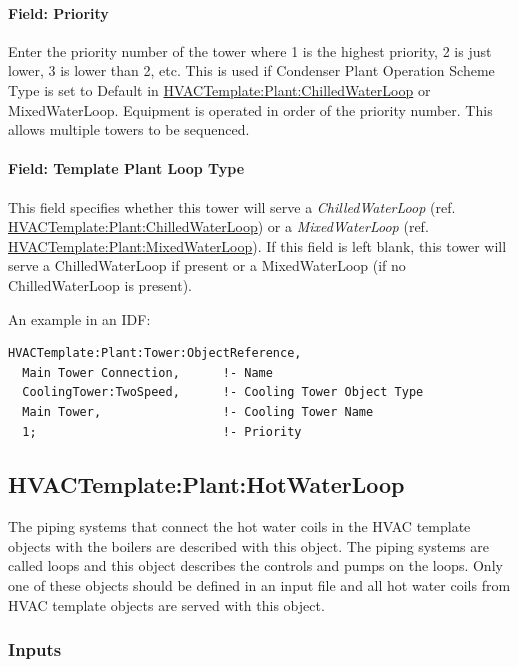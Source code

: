 \paragraph{Field: Priority}\label{field-priority-3}

Enter the priority number of the tower where 1 is the highest priority, 2 is just lower, 3 is lower than 2, etc. This is used if Condenser Plant Operation Scheme Type is set to Default in \hyperref[hvactemplateplantchilledwaterloop]{HVACTemplate:Plant:ChilledWaterLoop} or MixedWaterLoop. Equipment is operated in order of the priority number. This allows multiple towers to be sequenced.

\paragraph{Field: Template Plant Loop Type}\label{field-template-plant-loop-type-1}

This field specifies whether this tower will serve a \emph{ChilledWaterLoop} (ref. \hyperref[hvactemplateplantchilledwaterloop]{HVACTemplate:Plant:ChilledWaterLoop}) or a \emph{MixedWaterLoop} (ref. \hyperref[hvactemplateplantmixedwaterloop]{HVACTemplate:Plant:MixedWaterLoop}). If this field is left blank, this tower will serve a ChilledWaterLoop if present or a MixedWaterLoop (if no ChilledWaterLoop is present).

An example in an IDF:

\begin{lstlisting}
HVACTemplate:Plant:Tower:ObjectReference,
  Main Tower Connection,      !- Name
  CoolingTower:TwoSpeed,      !- Cooling Tower Object Type
  Main Tower,                 !- Cooling Tower Name
  1;                          !- Priority
\end{lstlisting}

\subsection{HVACTemplate:Plant:HotWaterLoop}\label{hvactemplateplanthotwaterloop}

The piping systems that connect the hot water coils in the HVAC template objects with the boilers are described with this object. The piping systems are called loops and this object describes the controls and pumps on the loops. Only one of these objects should be defined in an input file and all hot water coils from HVAC template objects are served with this object.

\subsubsection{Inputs}\label{inputs-28-000}

